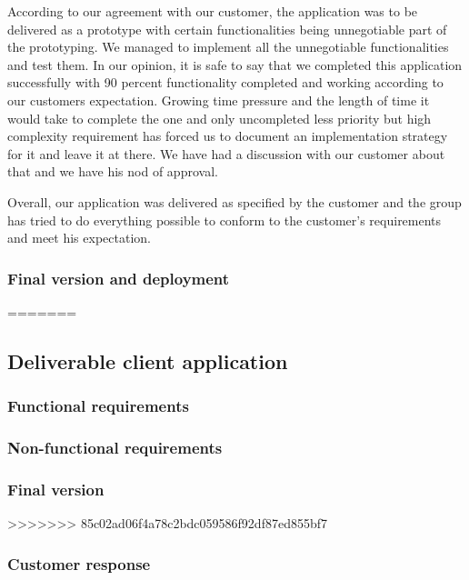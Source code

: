     According to our agreement with our customer, the application was to be delivered as a prototype with certain functionalities being unnegotiable part of the prototyping. We managed to implement all the unnegotiable functionalities and test them. In our opinion, it is safe to say that we completed this application successfully with 90 percent functionality completed and working according to our customers expectation. Growing time pressure and the length of time it would take to complete the one and only uncompleted less priority but high complexity requirement has forced us to document an implementation strategy for it and leave it at there. We have had a discussion with our customer about that and we have his nod of approval.
    
    Overall, our application was delivered as specified by the customer and the group has tried to do everything possible to conform to the customer's requirements and meet his expectation.
	\subsubsection{Final version and deployment}
=======
\subsection{Deliverable client application}
	\subsubsection{Functional requirements}
	\subsubsection{Non-functional requirements}
	\subsubsection{Final version}
>>>>>>> 85c02ad06f4a78c2bdc059586f92df87ed855bf7
	\subsubsection{Customer response}
	


